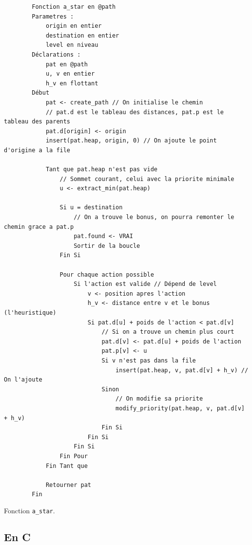\begin{longlisting}
    \begin{verbatim}
        Fonction a_star en @path
        Parametres :
            origin en entier
            destination en entier
            level en niveau
        Déclarations :
            pat en @path
            u, v en entier
            h_v en flottant
        Début
            pat <- create_path // On initialise le chemin
            // pat.d est le tableau des distances, pat.p est le tableau des parents
            pat.d[origin] <- origin
            insert(pat.heap, origin, 0) // On ajoute le point d'origine a la file

            Tant que pat.heap n'est pas vide
                // Sommet courant, celui avec la priorite minimale
                u <- extract_min(pat.heap)

                Si u = destination
                    // On a trouve le bonus, on pourra remonter le chemin grace a pat.p
                    pat.found <- VRAI
                    Sortir de la boucle
                Fin Si

                Pour chaque action possible
                    Si l'action est valide // Dépend de level
                        v <- position apres l'action
                        h_v <- distance entre v et le bonus (l'heuristique)
                        Si pat.d[u] + poids de l'action < pat.d[v]
                            // Si on a trouve un chemin plus court
                            pat.d[v] <- pat.d[u] + poids de l'action
                            pat.p[v] <- u
                            Si v n'est pas dans la file
                                insert(pat.heap, v, pat.d[v] + h_v) // On l'ajoute
                            Sinon
                                // On modifie sa priorite
                                modify_priority(pat.heap, v, pat.d[v] + h_v)
                            Fin Si
                        Fin Si
                    Fin Si
                Fin Pour
            Fin Tant que

            Retourner pat
        Fin
    \end{verbatim}
    \caption{Fonction \texttt{a\_star}.}
    \label{listing:c-a_star}
\end{longlisting}

\subsection{En C}

